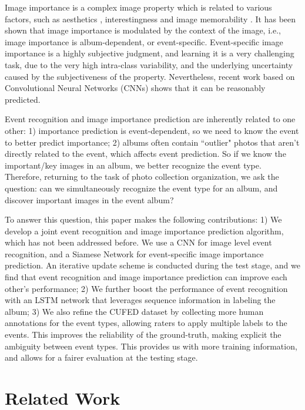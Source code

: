 \documentclass[runningheads]{llncs}
\begin{document}
Image importance is a complex image property which is related to various factors, such as aesthetics \cite{aesthe_14}, interestingness \cite{interesting} and image memorability \cite{Isola2011}. It has been shown \cite{CVPR} that image importance is modulated by the context of the image, i.e., image importance is album-dependent, or event-specific. Event-specific image importance is a highly subjective judgment, and learning it is a very challenging task, due to the very high intra-class variability, and the underlying uncertainty caused by the subjectiveness of the property. Nevertheless, recent work \cite{CVPR} based on Convolutional Neural Networks (CNNs) shows that it can be reasonably predicted. 

Event recognition and image importance prediction are inherently related to one other: 1) importance prediction is event-dependent, so we need to know the event to better predict importance; 2) albums often contain 		``outlier" photos that aren't directly related to the event, which affects event prediction. So if we know the important/key images in an album, we better recognize the event type.  Therefore, returning to the task of photo collection organization, we ask the question: can we simultaneously recognize the event type for an album, and discover important images in the event album? 

To answer this question, this paper makes the following contributions: 1) We develop a joint event recognition and image importance prediction algorithm, which has not been addressed before. We use a CNN for image level event recognition, and a Siamese Network for event-specific image importance prediction. An iterative update scheme is conducted during the test stage, and we find that event recognition and image importance prediction can improve each other's performance; 2) We further boost the performance of event recognition with an LSTM network that leverages sequence information in labeling the album; 3) We also refine the CUFED dataset by collecting more human annotations for the event types, allowing raters to apply multiple labels to the events. This improves the reliability of the ground-truth, making explicit the ambiguity between event types. This provides us with more training information, and allows for a fairer evaluation at the testing stage.

\section{Related Work}
\end{document}
